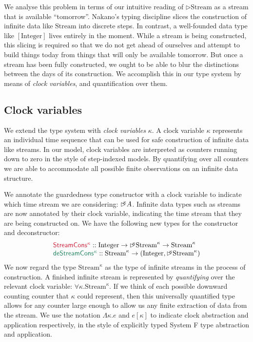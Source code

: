 \documentclass[natbib]{sigplanconf}
\newcommand{\cons}[1]{\textcolor{cons}{\textsf{#1}}}
\newcommand{\elim}[1]{\textcolor{elim}{\textsf{#1}}}
\newcommand{\tyname}[1]{\textrm{#1}}
\newcommand{\delay}[1]{\mathord{\rhd\kern-0.4em^{#1}}}
\begin{document}
We analyse this problem in terms of our intuitive reading of
$\rhd\tyname{Stream}$ as a stream that is available
``tomorrow''. Nakano's typing discipline slices the construction of
infinite data like $\tyname{Stream}$ into discrete steps. In contrast,
a well-founded data type like $[\tyname{Integer}]$ lives entirely in
the moment. While a stream is being constructed, this slicing is
required so that we do not get ahead of ourselves and attempt to build
things today from things that will only be available tomorrow. But
once a stream has been fully constructed, we ought to be able to blur
the distinctions between the days of its construction. We accomplish
this in our type system by means of \emph{clock variables}, and
quantification over them.

\subsection{Clock variables}
\label{sec:clock-vars}

We extend the type system with \emph{clock variables} $\kappa$. A
clock variable $\kappa$ represents an individual time sequence that
can be used for safe construction of infinite data like streams. In
our model, clock variables are interpreted as counters running down to
zero in the style of step-indexed models. By quantifying over all
counters we are able to accommodate all possible finite observations
on an infinite data structure.

We annotate the guardedness type constructor with a clock variable to
indicate which time stream we are considering: $\delay\kappa
A$. Infinite data types such as streams are now annotated by their
clock variable, indicating the time stream that they are being
constructed on. We have the following new types for the constructor
and deconstructor:
\begin{displaymath}
  \begin{array}{l}
    \cons{StreamCons$^\kappa$} :: \tyname{Integer} \to \delay\kappa \tyname{Stream}^\kappa \to \tyname{Stream}^\kappa \\
    \elim{deStreamCons$^\kappa$} :: \tyname{Stream}^\kappa \to (\tyname{Integer}, \delay\kappa\tyname{Stream}^\kappa)    
  \end{array}
\end{displaymath}
We now regard the type $\tyname{Stream}^\kappa$ as the type of
infinite streams in the process of construction. A finished infinite
stream is represented by \emph{quantifying} over the relevant clock
variable: $\forall \kappa. \tyname{Stream}^\kappa$. If we think of
each possible downward counting counter that $\kappa$ could represent,
then this universally quantified type allows for any counter large
enough to allow us any finite extraction of data from the stream. We
use the notation $\Lambda\kappa. e$ and $e[\kappa]$ to indicate clock
abstraction and application respectively, in the style of explicitly
typed System F type abstraction and application.
\end{document}
